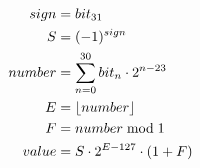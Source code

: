 \begin{equation*}
\begin{aligned}
    sign &= bit_{31} \\
    S &= (-1)^{sign} \\
    number &= \sum_{n=0}^{30}{bit_n \cdot 2^{n-23}} \\
    E &= \lfloor number\rfloor \\
    F &= number \bmod 1 \\
    value &= S \cdot 2^{E-127} \cdot (1 + F) \\
\end{aligned}
\end{equation*}
